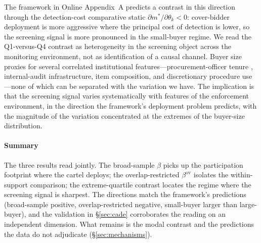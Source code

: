 The framework in Online Appendix~A predicts a contrast in this
direction through the detection-cost comparative static
$\partial m^*/\partial \theta_k < 0$: cover-bidder deployment
is more aggressive where the principal cost of detection is
lower, so the screening signal is more pronounced in the
small-buyer regime. We read the Q1-versus-Q4 contrast as
heterogeneity in the screening object across the monitoring
environment, not as identification of a causal channel. Buyer
size proxies for several correlated institutional features---procurement-officer
tenure \citep{coviello2017tenure}, internal-audit
infrastructure, item composition, and discretionary procedure
use \citep{decarolis2020rules,decarolis2017corruption}---none of
which can be separated with the variation we have. The
implication is that the screening signal varies systematically
with features of the enforcement environment, in the direction
the framework's deployment problem predicts, with the magnitude
of the variation concentrated at the extremes of the
buyer-size distribution.

\paragraph*{Summary} The three results read jointly. The
broad-sample $\beta$ picks up the participation footprint where
the cartel deploys; the overlap-restricted $\beta^{\text{ov}}$
isolates the within-support comparison; the extreme-quartile
contrast locates the regime where the screening signal is
sharpest. The directions match the framework's predictions
(broad-sample positive, overlap-restricted negative, small-buyer
larger than large-buyer), and the validation in §\ref{sec:cade}
corroborates the reading on an independent dimension. What
remains is the modal contrast and the predictions the data do
not adjudicate (§\ref{sec:mechanisms}).
